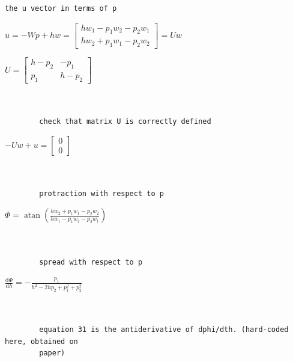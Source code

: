 \documentclass[11pt]{article}
\begin{document}
            \begin{Verbatim}[commandchars=\\\{\}]
        the u vector in terms of p
            \end{Verbatim}

            $\displaystyle u = - Wp + h w = \left[\begin{matrix}h w_{1} - p_{1} w_{2} - p_{2} w_{1}\\h w_{2} + p_{1} w_{1} - p_{2} w_{2}\end{matrix}\right] = Uw$

            
            $\displaystyle U = \left[\begin{matrix}h - p_{2} & - p_{1}\\p_{1} & h - p_{2}\end{matrix}\right]$

            
            \begin{Verbatim}[commandchars=\\\{\}]


        check that matrix U is correctly defined
            \end{Verbatim}

            $\displaystyle - Uw + u = \left[\begin{matrix}0\\0\end{matrix}\right]$

            
            \begin{Verbatim}[commandchars=\\\{\}]


        protraction with respect to p
            \end{Verbatim}

            $\displaystyle \Phi = \operatorname{atan}{\left(\frac{h w_{2} + p_{1} w_{1} - p_{2} w_{2}}{h w_{1} - p_{1} w_{2} - p_{2} w_{1}} \right)}$

            
            \begin{Verbatim}[commandchars=\\\{\}]


        spread with respect to p
            \end{Verbatim}

            $\displaystyle \frac{\mathrm{d}\Phi}{\mathrm{d}h} = - \frac{p_{1}}{h^{2} - 2 h p_{2} + p_{1}^{2} + p_{2}^{2}}$

            
            \begin{Verbatim}[commandchars=\\\{\}]


        equation 31 is the antiderivative of dphi/dth. (hard-coded here, obtained on
        paper)
            \end{Verbatim}
\end{document}
